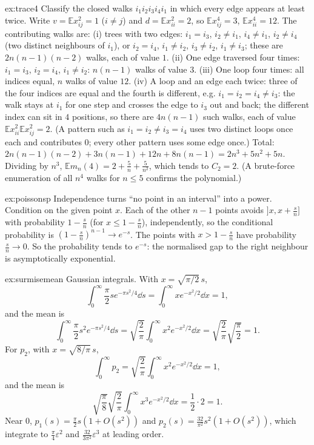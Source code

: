 \begin{solution}{ex:trace4}
\idea Classify the closed walks $i_1i_2i_3i_4i_1$ in which every edge appears at least twice.
\writeup Write $v=\mathbb E x_{ij}^2=1$ ($i\ne j$) and $d=\mathbb Ex_{ii}^2=2$, so $\mathbb Ex_{ij}^4=3$, $\mathbb Ex_{ii}^4=12$. The contributing walks are:
(i) trees with two edges: $i_1=i_3$, $i_2\ne i_1$, $i_4\ne i_1$, $i_2\ne i_4$ (two distinct neighbours of $i_1$), or $i_2=i_4$, $i_1\ne i_2$, $i_3\ne i_2$, $i_1\ne i_3$;
these are $2n(n-1)(n-2)$ walks, each of value $1$. (ii) One edge traversed four times: $i_1=i_3$, $i_2=i_4$, $i_1\ne i_2$: $n(n-1)$ walks of value $3$.
(iii) One loop four times: all indices equal, $n$ walks of value $12$. (iv) A loop and an edge each twice: three of the four indices are equal and the fourth is different, e.g. $i_1=i_2=i_4\ne i_3$: the walk stays at
$i_1$ for one step and crosses the edge to $i_3$ out and back; the different index can sit in $4$ positions, so there are $4n(n-1)$ such walks, each of
value $\mathbb Ex_{ii}^2\mathbb Ex_{ij}^2=2$. (A pattern such as $i_1=i_2\ne i_3=i_4$ uses two distinct loops once each and contributes $0$; every other
pattern uses some edge once.) Total:
$2n(n-1)(n-2)+3n(n-1)+12n+8n(n-1)=2n^3+5n^2+5n$. Dividing by $n^3$, $\mathbb Em_n(4)=2+\frac5n+\frac5{n^2}$, which tends to $C_2=2$.
(A brute-force enumeration of all $n^4$ walks for $n\le5$ confirms the polynomial.)
\end{solution}

\begin{solution}{ex:poissonsp}
\idea Independence turns ``no point in an interval'' into a power.
\writeup Condition on the given point $x$. Each of the other $n-1$ points avoids $]x,x+\frac sn]$ with probability $1-\frac sn$ (for $x\le1-\frac sn$), independently,
so the conditional probability is $(1-\frac sn)^{n-1}\to e^{-s}$. The points with $x>1-\frac sn$ have probability $\frac sn\to0$. So the probability tends to $e^{-s}$:
the normalised gap to the right neighbour is asymptotically exponential.
\end{solution}

\begin{solution}{ex:surmisemean}
\idea Gaussian integrals.
\writeup With $x=\sqrt{\pi/2}\,s$,
\[
\int_0^\infty\frac\pi2se^{-\pi s^2/4}\dd s=\int_0^\infty xe^{-x^2/2}\dd x=1,
\]
and the mean is
\[
\int_0^\infty\frac\pi2s^2e^{-\pi s^2/4}\dd s=\sqrt{\frac2\pi}\int_0^\infty x^2e^{-x^2/2}\dd x=\sqrt{\frac2\pi}\sqrt{\frac\pi2}=1.
\]
For $p_2$, with $x=\sqrt{8/\pi}\,s$,
\[
\int_0^\infty p_2=\sqrt{\frac2\pi}\int_0^\infty x^2e^{-x^2/2}\dd x=1,
\]
and the mean is
\[
\sqrt{\frac\pi8}\sqrt{\frac2\pi}\int_0^\infty x^3e^{-x^2/2}\dd x=\frac12\cdot2=1.
\]
Near $0$,
$p_1(s)=\frac\pi2s(1+O(s^2))$ and $p_2(s)=\frac{32}{\pi^2}s^2(1+O(s^2))$, which integrate to $\frac\pi4\varepsilon^2$ and $\frac{32}{3\pi^2}\varepsilon^3$ at leading order.
\end{solution}

